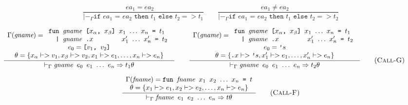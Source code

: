 \documentclass[10pt]{../sigplanconf}
\newcommand{\nfrac}[2]{\frac{\displaystyle{#1}}{\displaystyle{#2}}}
\newcommand{\tagsc}[1]{\tag{\scshape #1}}
\begin{document}
\begin{minipage}{2\linewidth}
  \centering

  \begin{equation}
    \nfrac{
      ea_1 = ea_2 \quad
    }{
      |-_\Gamma \texttt{if $ea_1$ = $ea_2$ then $t_1$ else $t_2$} => t_1
    }
    \qquad
    \nfrac{
      ea_1 \neq ea_2 \quad
    }{
      |-_\Gamma \texttt{if $ea_1$ = $ea_2$ then $t_1$ else $t_2$} => t_2
    } \tagsc{If}
\end{equation}

\begin{equation}
\hspace{-0.7cm}
  \nfrac{
    \begin{array}{c}
      \Gamma(\textit{gname}) =
      \begin{array}{l}
        \texttt{fun \textit{\rmfamily gname} [$x_\alpha$, $x_\beta$] $x_1$ $\ldots$ $x_n$ = $t_1$} \\
        \texttt{\ \ | \textit{\rmfamily gname}\ \texttt{.}$x$ \hspace{1.1cm} $x_1'$ $\ldots$ $x_n'$ = $t_2$} \\
      \end{array} \\
      e_0 = \texttt{[$v_1$, $v_2$]} \\
      \theta = \{x_\alpha |-> v_1, x_\beta |-> v_2, x_1 |-> e_1, \ldots, x_n |-> e_n\} 
    \end{array}
  }{
    |-_\Gamma \texttt{\textit{\rmfamily gname} $e_0$ $e_1$ $\ldots$ $e_n$} => t_1\theta
  }
\qquad
  \nfrac{
    \begin{array}{c}
      \Gamma(\textit{gname}) =
      \begin{array}{l}
        \texttt{fun \textit{\rmfamily gname} [$x_\alpha$, $x_\beta$] $x_1$ $\ldots$ $x_n$ = $t_1$} \\
        \texttt{\ \ | \textit{\rmfamily gname}\ \texttt{.}$x$ \hspace{1.1cm} $x_1'$ $\ldots$ $x_n'$ = $t_2$} \\
      \end{array} \\
      e_0 = \texttt{'}s \\
      \theta = \{\texttt{.}x |-> \texttt{'}s, x_1' |-> e_1, \ldots, x_n' |-> e_n\}
    \end{array}
  }{
    |-_\Gamma \texttt{\textit{\rmfamily gname} $e_0$ $e_1$ $\ldots$ $e_n$} => t_2\theta
  }
  \tagsc{Call-G}
\end{equation}

\begin{equation}
  \nfrac{
    \begin{array}{c}
      \Gamma(\textit{fname}) =
        \texttt{fun \textit{\rmfamily fname} $x_1$ $x_2$ $\ldots$ $x_n$ = $t$}
        \\
      \theta = \{x_1 |-> e_1, x_2 |-> e_2, \ldots, x_n |-> e_n\}
    \end{array}
  }{
    |-_\Gamma \texttt{\textit{\rmfamily fname} $e_1$ $e_2$ $\ldots$ $e_n$} => t\theta
  } \tagsc{Call-F}
\end{equation}

\label{fig:semantics}
\end{minipage}



\begin{figure*}\centering



\end{figure*}
\end{document}
